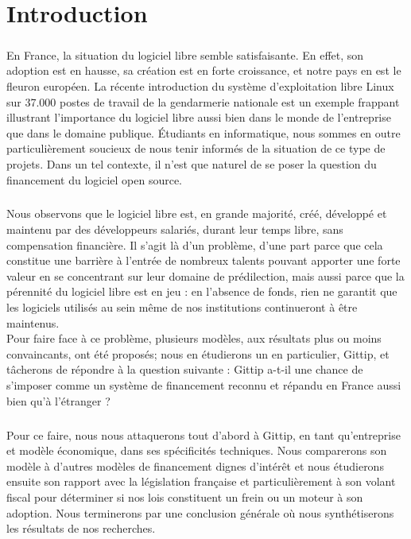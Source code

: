 \chapter*{Introduction}

\paragraph{}
En France, la situation du logiciel libre semble satisfaisante.
En effet, son adoption est en hausse, sa création est en forte croissance,
et notre pays en est le fleuron européen.
La récente introduction du système d'exploitation libre Linux sur 37.000
postes de travail de la gendarmerie nationale est un exemple frappant
illustrant l'importance du logiciel libre aussi bien dans le monde de
l'entreprise que dans le domaine publique.
Étudiants en informatique, nous sommes en outre particulièrement soucieux
de nous tenir informés de la situation de ce type de projets.
Dans un tel contexte, il n'est que naturel de se poser la question du
financement du logiciel open source.

\paragraph{}
Nous observons que le logiciel libre est, en grande majorité, créé,
développé et maintenu par des développeurs salariés, durant leur temps
libre, sans compensation financière. Il s'agit là d'un problème, d'une
part parce que cela constitue une barrière à l'entrée de nombreux talents
pouvant apporter une forte valeur en se concentrant sur leur domaine de
prédilection, mais aussi parce que la pérennité du logiciel libre est en
jeu : en l'absence de fonds, rien ne garantit que les logiciels utilisés
au sein même de nos institutions continueront à être maintenus.\\
Pour faire face à ce problème, plusieurs modèles, aux résultats plus ou
moins convaincants, ont été proposés; nous en étudierons un en
particulier, Gittip, et tâcherons de répondre à la question suivante :
Gittip a-t-il une chance de s'imposer comme un système de financement
reconnu et répandu en France aussi bien qu'à l'étranger ?

\paragraph{}
Pour ce faire, nous nous attaquerons tout d'abord à Gittip, en tant
qu'entreprise et modèle économique, dans ses spécificités techniques.
Nous comparerons son modèle à d'autres modèles de financement
dignes d'intérêt et nous étudierons ensuite son rapport avec la législation
française et particulièrement à son volant fiscal pour déterminer si nos
lois constituent un frein ou un moteur à son adoption.
Nous terminerons par une conclusion générale où nous synthétiserons
les résultats de nos recherches.
